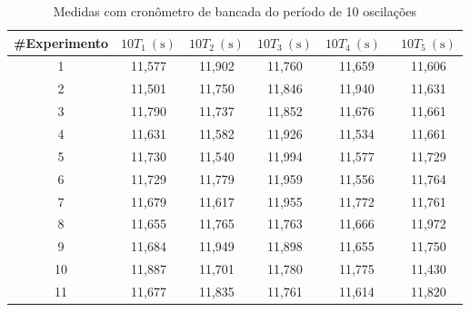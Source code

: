 \documentclass[12pt, a4paper, brazil]{article}
\begin{document}
\begin{table}[H]

	\centering
	\caption{Medidas com cronômetro de bancada do período de 10 oscilações}
	\begin{tabular}{c c c c c c}
		\hline
		\#Experimento & ${10T_{1}}\ \mathrm{(s)}$ & ${10T_{2}}\ \mathrm{(s)}$ & ${10T_{3}}\ \mathrm{(s)}$ & ${10T_{4}}\ \mathrm{(s)}$\  & ${10T_{5}}\ \mathrm{(s)}$ \\ [0.5ex]
		\hline
		1             & 11,577                    & 11,902                    & 11,760                    & 11,659                      & 11,606                    \\
		2             & 11,501                    & 11,750                    & 11,846                    & 11,940                      & 11,631                    \\
		3             & 11,790                    & 11,737                    & 11,852                    & 11,676                      & 11,661                    \\
		4             & 11,631                    & 11,582                    & 11,926                    & 11,534                      & 11,661                    \\
		5             & 11,730                    & 11,540                    & 11,994                    & 11,577                      & 11,729                    \\
		6             & 11,729                    & 11,779                    & 11,959                    & 11,556                      & 11,764                    \\
		7             & 11,679                    & 11,617                    & 11,955                    & 11,772                      & 11,761                    \\
		8             & 11,655                    & 11,765                    & 11,763                    & 11,666                      & 11,972                    \\
		9             & 11,684                    & 11,949                    & 11,898                    & 11,655                      & 11,750                    \\
		10            & 11,887                    & 11,701                    & 11,780                    & 11,775                      & 11,430                    \\
		11            & 11,677                    & 11,835                    & 11,761                    & 11,614                      & 11,820                    \\

\end{tabular}
\end{table}
\end{document}
